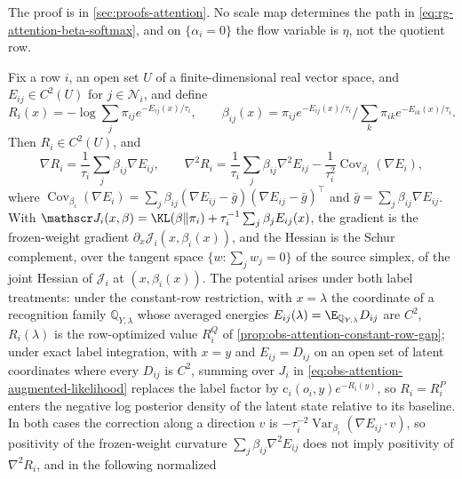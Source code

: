 The proof is in \cref{sec:proofs-attention}.
No scale map determines the path in \eqref{eq:rg-attention-beta-softmax}, and
on \(\{\alpha_i=0\}\) the flow variable is \(\eta\), not the quotient row.

Fix a row \(i\), an open set \(U\) of a finite-dimensional real vector space,
and \(E_{ij}\in C^2(U)\) for \(j\in\mathcal N_i\), and define
\begin{equation}
R_i(x)=-\log\sum_j\pi_{ij}e^{-E_{ij}(x)/\tau_i},
\qquad
\beta_{ij}(x)=\pi_{ij}e^{-E_{ij}(x)/\tau_i}\Big/\sum_k\pi_{ik}e^{-E_{ik}(x)/\tau_i}.
\label{eq:obs-attention-reduced-potential}
\end{equation}
Then \(R_i\in C^2(U)\), and
\begin{equation}
\nabla R_i=\frac1{\tau_i}\sum_j\beta_{ij}\nabla E_{ij},
\qquad
\nabla^2R_i=\frac1{\tau_i}\sum_j\beta_{ij}\nabla^2E_{ij}
-\frac1{\tau_i^2}\operatorname{Cov}_{\beta_i}(\nabla E_i),
\label{eq:obs-attention-reduced-hessian}
\end{equation}
where \(\operatorname{Cov}_{\beta_i}(\nabla E_i)
=\sum_j\beta_{ij}(\nabla E_{ij}-\bar g)(\nabla E_{ij}-\bar g)^\top\) and
\(\bar g=\sum_j\beta_{ij}\nabla E_{ij}\). With
\(\mathscr J_i(x,\beta)=\KL(\beta\Vert\pi_i)+\tau_i^{-1}\sum_j\beta_jE_{ij}(x)\),
the gradient is the frozen-weight gradient
\(\partial_x\mathscr J_i(x,\beta_i(x))\), and the Hessian is the Schur
complement, over the tangent space \(\{w:\sum_jw_j=0\}\) of the source simplex,
of the joint Hessian of \(\mathscr J_i\) at \((x,\beta_i(x))\). The potential
arises under both label treatments: under the constant-row restriction, with
\(x=\lambda\) the coordinate of a recognition family \(\mathbb Q_{Y,\lambda}\)
whose averaged energies \(E_{ij}(\lambda)=\E_{\mathbb Q_{Y,\lambda}}D_{ij}\)
are \(C^2\), \(R_i(\lambda)\) is the row-optimized value \(R_i^Q\) of
\cref{prop:obs-attention-constant-row-gap}; under exact label integration, with
\(x=y\) and \(E_{ij}=D_{ij}\) on an open set of latent coordinates where every
\(D_{ij}\) is \(C^2\), summing over \(J_i\) in
\eqref{eq:obs-attention-augmented-likelihood} replaces the label factor by
\(\mathrm c_i(o_i,y)e^{-R_i(y)}\), so \(R_i=R_i^P\) enters the negative log
posterior density of the latent state relative to its baseline. In both cases
the correction along a direction \(v\) is
\(-\tau_i^{-2}\operatorname{Var}_{\beta_i}(\nabla E_{ij}\cdot v)\), so
positivity of the frozen-weight curvature \(\sum_j\beta_{ij}\nabla^2E_{ij}\)
does not imply positivity of \(\nabla^2R_i\), and in the following normalized

